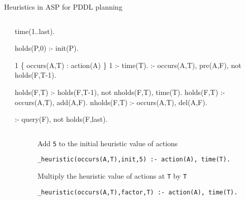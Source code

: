 
\begin{block}{Heuristics in ASP for PDDL planning}


\begin{columns} \begin{column}{.02\linewidth}\end{column}
\begin{column}{.98\linewidth}


\begin{semiverbatim}
time(1..last).    

holds(P,0) :- init(P).

1 \{ occurs(A,T) : action(A) \} 1 :- time(T).
:-  occurs(A,T), pre(A,F), not holds(F,T-1).

holds(F,T)  :- holds(F,T-1), not nholds(F,T), time(T).
holds(F,T)  :- occurs(A,T), add(A,F).
nholds(F,T) :- occurs(A,T), del(A,F).

:- query(F), not holds(F,last).

\end{semiverbatim}

\end{column} \end{columns}


\begin{columns} \begin{column}{.02\linewidth}\end{column}
\begin{column}{.98\linewidth}

Add \verb|5| to the initial heuristic value of actions

\verb|_heuristic(occurs(A,T),init,5) :- action(A), time(T).|

\bigskip \bigskip

Multiply the heuristic value of actions at \verb|T| by \verb|T|

\verb|_heuristic(occurs(A,T),factor,T) :- action(A), time(T).|

\bigskip \bigskip


\end{column}
\end{columns}
\end{block}
